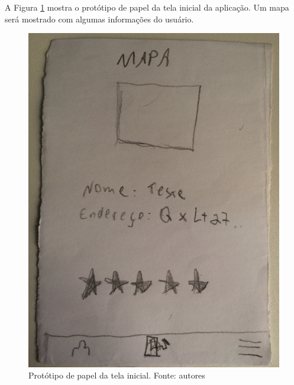 A Figura \ref{img:prototipo_de_papel_tela_incial} mostra o protótipo de papel da tela inicial da aplicação. Um mapa será mostrado com algumas informações do usuário.
\begin{figure}[H]
    \centering
    \includegraphics[scale=0.05, angle=-90]{figuras/prototipo_papel_inicial.jpg}
    \caption[Protótipo de papel da tela inicial]{Protótipo de papel da tela inicial. Fonte: autores}
    \label{img:prototipo_de_papel_tela_incial}
\end{figure}


